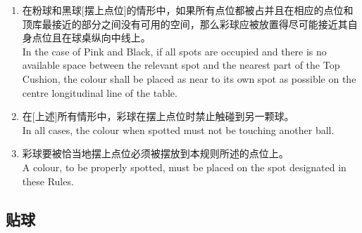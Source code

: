 \begin{enumerate}[label=(\alph*)]
    \item 在粉球和黑球[摆上点位]的情形中，如果所有点位都被占并且在相应的点位和顶库最接近的部分之间没有可用的空间，那么彩球应被放置得尽可能接近其自身点位且在球桌纵向中线上。\\
    In the case of Pink and Black, if all spots are occupied and there is no available space between the relevant spot and the nearest part of the Top Cushion, the colour shall be placed as near to its own spot as possible on the centre longitudinal line of the table.
    \item 在[上述]所有情形中，彩球在摆上点位时禁止触碰到另一颗球。\\
    In all cases, the colour when spotted must not be touching another ball.
    \item 彩球要被恰当地摆上点位必须被摆放到本规则所述的点位上。\\
    A colour, to be properly spotted, must be placed on the spot designated in these Rules.
\end{enumerate}

\subsection{贴球}

